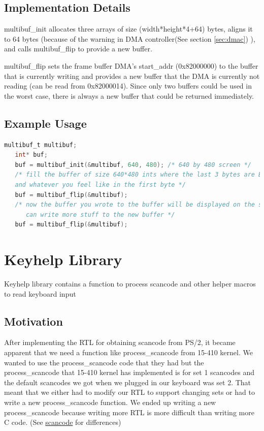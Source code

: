 \documentclass[10pt]{article}
\begin{document}
\subsection{Implementation Details}

multibuf\_init allocates three arrays of size (width*height*4+64) bytes, aligns it to 64 bytes (because of the warning in DMA controller(See section \ref{sec:dmac}) ), and calls multibuf\_flip to provide a new buffer.

multibuf\_flip sets the frame buffer DMA's start\_addr (0x82000000) to the buffer that is currently writing and provides a new buffer that the DMA is currently not reading (can be read from 0x82000014). Since only two buffers could be used in the worst case, there is always a new buffer that could be returned immediately.

\subsection{Example Usage}

\begin{lstlisting}[basicstyle=\footnotesize,language=C]
   multibuf_t multibuf;
   int* buf;
   buf = multibuf_init(&multibuf, 640, 480); /* 640 by 480 screen */
   /* fill the buffer of size 640*480 ints where the last 3 bytes are BGR (thanks to little endianness)
   and whatever you feel like in the first byte */
   buf = multibuf_flip(&multibuf); 
   /* now the buffer you wrote to the buffer will be displayed on the screen and you 
      can write more stuff to the new buffer */
   buf = multibuf_flip(&multibuf);
\end{lstlisting}

\section{Keyhelp Library}

\label{sec:keyhelp}

Keyhelp library contains a function to process scancode and other helper macros to read keyboard input

\subsection{Motivation}

After implementing the RTL for obtaining scancode from PS/2, it became apparent that we need a function like process\_scancode from 15-410 kernel. We wanted to use the process\_scancode code that they had but the process\_scancode that 15-410 kernel has implemented is for set 1 scancodes and the default scancodes we got when we plugged in our keyboard was set 2. That meant that we either had to modify our RTL to support changing sets or had to write a new process\_scancode function. We ended up writing a new process\_scancode because writing more RTL is more difficult than writing more C code. (See \href{http://en.wikipedia.org/wiki/Scancode}{scancode} for differences) 
\end{document}
